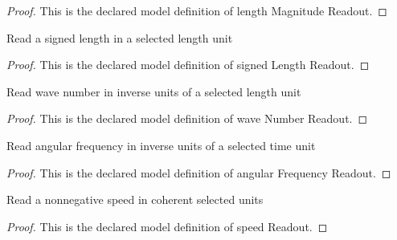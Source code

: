 \begin{proof}
  This is the declared model definition of length Magnitude Readout.
\end{proof}
\begin{definition}
  \label{def:physics:phyx-mini-0288:phyxminiproblems-problemphyxmini0288-signedlengthreadout}
  Read a signed length in a selected length unit
\end{definition}
\begin{proof}
  This is the declared model definition of signed Length Readout.
\end{proof}
\begin{definition}
  \label{def:physics:phyx-mini-0288:phyxminiproblems-problemphyxmini0288-wavenumberreadout}
  Read wave number in inverse units of a selected length unit
\end{definition}
\begin{proof}
  This is the declared model definition of wave Number Readout.
\end{proof}
\begin{definition}
  \label{def:physics:phyx-mini-0288:phyxminiproblems-problemphyxmini0288-angularfrequencyreadout}
  Read angular frequency in inverse units of a selected time unit
\end{definition}
\begin{proof}
  This is the declared model definition of angular Frequency Readout.
\end{proof}
\begin{definition}
  \label{def:physics:phyx-mini-0288:phyxminiproblems-problemphyxmini0288-speedreadout}
  Read a nonnegative speed in coherent selected units
\end{definition}
\begin{proof}
  This is the declared model definition of speed Readout.
\end{proof}
